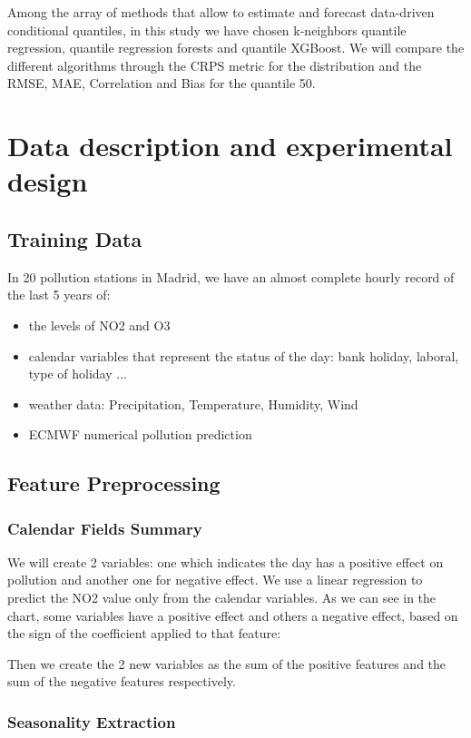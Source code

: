 \documentclass[a4paper,twocolumn,5p]{elsarticle}
\begin{document}
Among the array of methods that allow to estimate and forecast
data-driven conditional quantiles, in this study we have chosen
k-neighbors quantile regression, quantile regression forests and quantile XGBoost. 
We will compare the different algorithms through the CRPS metric for the 
distribution and the RMSE, MAE, Correlation and Bias for the quantile 50.

\section{Data description and experimental design}

\subsection{Training Data}

In 20 pollution stations in Madrid, we have an almost complete hourly record of the last 5 years of:
\begin{itemize}
  \item the levels of NO2 and O3
  \item calendar variables that represent the status of the day: bank holiday, laboral, type of holiday ...
  \item weather data: Precipitation, Temperature, Humidity, Wind
  \item ECMWF numerical pollution prediction
\end{itemize} 

\subsection{Feature Preprocessing}

\subsubsection{Calendar Fields Summary}

We will create 2 variables: one which indicates the day has a positive effect on pollution and 
another one for negative effect. We use a linear regression to predict the NO2 value only from the calendar variables.
As we can see in the chart, some variables have a positive effect and others a negative effect, based on the
sign of the coefficient applied to that feature:

Then we create the 2 new variables as the sum of the positive features and the sum of the negative features respectively.

\subsubsection{Seasonality Extraction}
\end{document}
